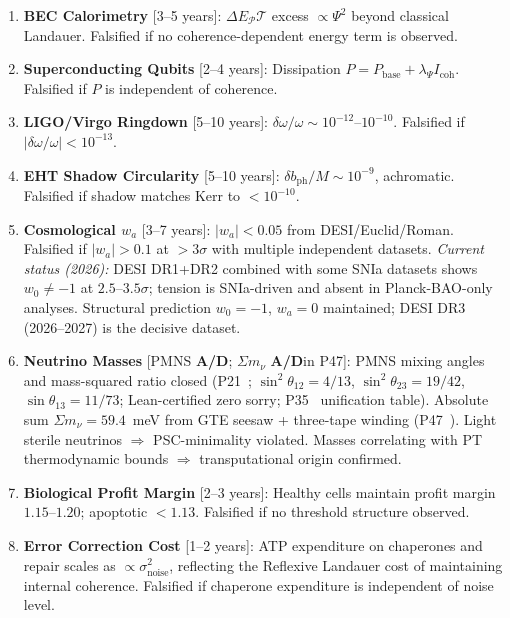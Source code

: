 \documentclass[11pt]{article}
\newcommand{\PT}{\mathcal{P}\mathcal{T}}
\newcommand{\CatAD}{\textbf{A/D}}
\theoremstyle{plain}
\theoremstyle{definition}
\theoremstyle{remark}
\begin{document}
\begin{enumerate}[label=\arabic*.,leftmargin=2em]
\item \textbf{BEC Calorimetry} [3--5 years]:
$\Delta E_\PT$ excess $\propto \Psi^2$ beyond classical Landauer.
Falsified if no coherence-dependent energy term is observed.

\item \textbf{Superconducting Qubits} [2--4 years]:
Dissipation $P = P_\mathrm{base} + \lambda_\Psi I_\mathrm{coh}$.
Falsified if $P$ is independent of coherence.

\item \textbf{LIGO/Virgo Ringdown} [5--10 years]:
$\delta\omega/\omega \sim 10^{-12}$--$10^{-10}$.
Falsified if $|\delta\omega/\omega| < 10^{-13}$.

\item \textbf{EHT Shadow Circularity} [5--10 years]:
$\delta b_\mathrm{ph}/M \sim 10^{-9}$, achromatic.
Falsified if shadow matches Kerr to $< 10^{-10}$.

\item \textbf{Cosmological $w_a$} [3--7 years]:
$|w_a| < 0.05$ from DESI/Euclid/Roman.
Falsified if $|w_a| > 0.1$ at $> 3\sigma$ with multiple independent datasets.
\emph{Current status (2026):} DESI DR1+DR2 combined with some SNIa datasets
shows $w_0 \neq -1$ at $2.5$--$3.5\sigma$; tension is SNIa-driven and
absent in Planck-BAO-only analyses. Structural prediction $w_0=-1$, $w_a=0$ maintained;
DESI DR3 (2026--2027) is the decisive dataset.

\item \textbf{Neutrino Masses} [PMNS \CatAD; $\Sigma m_\nu$ \CatAD in P47]:
PMNS mixing angles and mass-squared ratio closed (P21~\cite{SpivackNeutrino}; $\sin^2\theta_{12} = 4/13$, $\sin^2\theta_{23} = 19/42$, $\sin\theta_{13} = 11/73$; Lean-certified zero sorry; P35~\cite{SpivackGTEUnification} unification table).
Absolute sum $\Sigma m_\nu = 59.4$~meV from GTE seesaw + three-tape winding (P47~\cite{SpivackGTECosmology}).
Light sterile neutrinos $\Rightarrow$ PSC-minimality violated.
Masses correlating with PT thermodynamic bounds $\Rightarrow$ transputational origin confirmed.

\item \textbf{Biological Profit Margin} [2--3 years]:
Healthy cells maintain profit margin $1.15$--$1.20$; apoptotic $< 1.13$.
Falsified if no threshold structure observed.

\item \textbf{Error Correction Cost} [1--2 years]:
ATP expenditure on chaperones and repair scales as $\propto\sigma^2_\mathrm{noise}$,
reflecting the Reflexive Landauer cost of maintaining internal coherence.
Falsified if chaperone expenditure is independent of noise level.


\end{enumerate}
\end{document}
